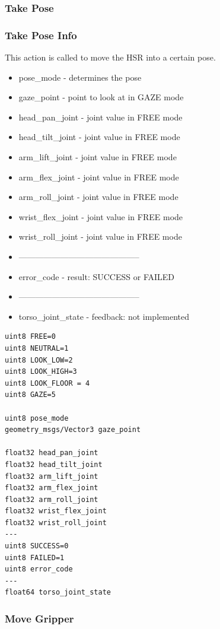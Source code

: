 \documentclass[main.tex]{subfiles}
\begin{document}
					\subsubsection{Take Pose}
					\label{msg_take_pose}
					\subsubsection{Take Pose Info}
						This action is called to move the HSR into a certain pose.
						\begin{itemize}
							\item pose\_mode - determines the pose
							\item gaze\_point - point to look at in GAZE mode
							\item head\_pan\_joint - joint value in FREE mode
							\item head\_tilt\_joint - joint value in FREE mode
							\item arm\_lift\_joint - joint value in FREE mode
							\item arm\_flex\_joint - joint value in FREE mode
							\item arm\_roll\_joint - joint value in FREE mode
							\item wrist\_flex\_joint - joint value in FREE mode
							\item wrist\_roll\_joint - joint value in FREE mode
							\item --------------------------------------------
							\item error\_code - result: SUCCESS or FAILED
							\item --------------------------------------------
							\item torso\_joint\_state - feedback: not implemented
						\end{itemize}
					\begin{lstlisting}
uint8 FREE=0
uint8 NEUTRAL=1
uint8 LOOK_LOW=2
uint8 LOOK_HIGH=3
uint8 LOOK_FLOOR = 4
uint8 GAZE=5
		
uint8 pose_mode
geometry_msgs/Vector3 gaze_point
		
float32 head_pan_joint
float32 head_tilt_joint
float32 arm_lift_joint
float32 arm_flex_joint
float32 arm_roll_joint
float32 wrist_flex_joint
float32 wrist_roll_joint
---
uint8 SUCCESS=0
uint8 FAILED=1
uint8 error_code
---
float64 torso_joint_state
\end{lstlisting}
				\subsubsection{Move Gripper}
				\label{msg_move_gripper}
\end{document}
